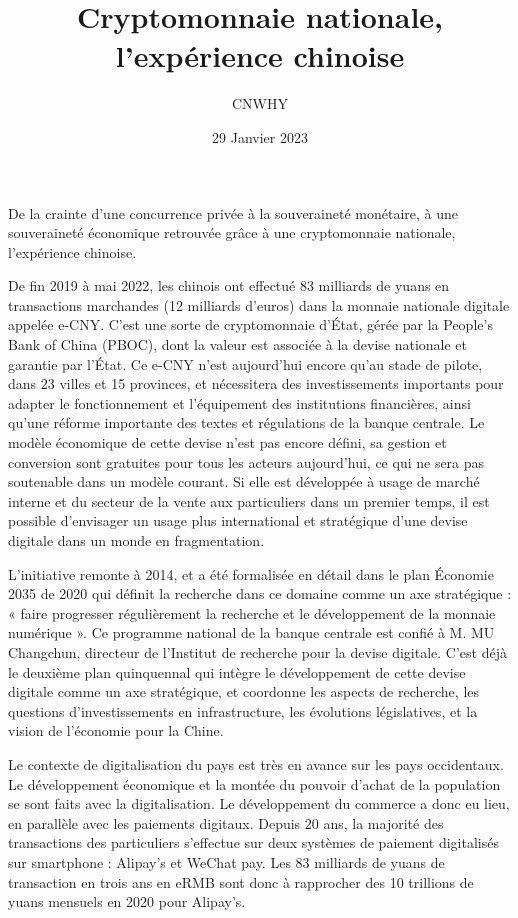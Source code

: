 \documentclass[a4paper]{article}
\title{Cryptomonnaie nationale, l’expérience chinoise}
\author{CNWHY}
\date{29 Janvier 2023}
\begin{document}
De la crainte d’une concurrence privée à la souveraineté monétaire, à une souveraineté économique retrouvée grâce à une cryptomonnaie nationale, l’expérience chinoise.



De fin 2019 à mai 2022, les chinois ont effectué 83 milliards de yuans en transactions marchandes (12 milliards d’euros) dans la monnaie nationale digitale appelée e-CNY. C’est une sorte de cryptomonnaie d’État, gérée par la People’s Bank of China (PBOC), dont la valeur est associée à la devise nationale et garantie par l’État. Ce e-CNY n’est aujourd’hui encore qu’au stade de pilote, dans 23 villes et 15 provinces, et nécessitera des investissements importants pour adapter le fonctionnement et l’équipement des institutions financières, ainsi qu’une réforme importante des textes et régulations de la banque centrale. Le modèle économique de cette devise n’est pas encore défini, sa gestion et conversion sont gratuites pour tous les acteurs aujourd’hui, ce qui ne sera pas soutenable dans un modèle courant. Si elle est développée à usage de marché interne et du secteur de la vente aux particuliers dans un premier temps, il est possible d’envisager un usage plus international et stratégique d’une devise digitale dans un monde en fragmentation. 

L’initiative remonte à 2014, et a été formalisée en détail dans le plan Économie 2035 de 2020 qui définit la recherche dans ce domaine comme un axe stratégique : « faire progresser régulièrement la recherche et le développement de la monnaie numérique ». Ce programme national de la banque centrale est confié à M. MU Changchun, directeur de l’Institut de recherche pour la devise digitale. C’est déjà le deuxième plan quinquennal qui intègre le développement de cette devise digitale comme un axe stratégique, et coordonne les aspects de recherche, les questions d’investissements en infrastructure, les évolutions législatives, et la vision de l’économie pour la Chine. 



Le contexte de digitalisation du pays est très en avance sur les pays occidentaux. Le développement économique et la montée du pouvoir d’achat de la population se sont faits avec la digitalisation. Le développement du commerce a donc eu lieu, en parallèle avec les paiements digitaux. Depuis 20 ans, la majorité des transactions des particuliers s’effectue sur deux systèmes de paiement digitalisés sur smartphone : Alipay’s et WeChat pay. Les 83 milliards de yuans de transaction en trois ans en eRMB sont donc à rapprocher des 10 trillions de yuans mensuels en 2020 pour Alipay’s. 
\end{document}
